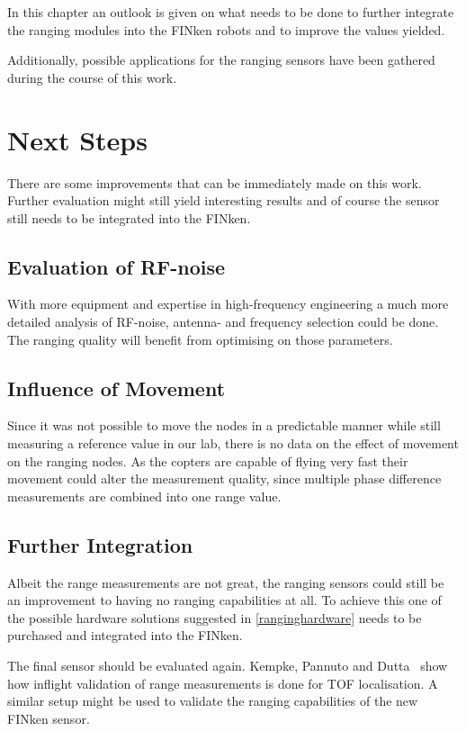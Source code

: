 In this chapter an outlook is given on what needs to be done to further integrate the ranging modules into the FINken robots and to improve the values yielded.

Additionally, possible applications for the ranging sensors have been gathered during the course of this work.

\section{Next Steps}

There are some improvements that can be immediately made on this work.
Further evaluation might still yield interesting results and of course the sensor still needs to be integrated into the FINken.

\subsection{Evaluation of RF-noise}
With more equipment and expertise in high-frequency engineering a much more detailed analysis of RF-noise, antenna- and frequency selection could be done.
The ranging quality will benefit from optimising on those parameters.

\subsection{Influence of Movement}
Since it was not possible to move the nodes in a predictable manner while still measuring a reference value in our lab, there is no data on the effect of movement on the ranging nodes.
As the copters are capable of flying very fast their movement could alter the measurement quality, since multiple phase difference measurements are combined into one range value.

\subsection{Further Integration}

Albeit the range measurements are not great, the ranging sensors could still be an improvement to having no ranging capabilities at all.
To achieve this one of the possible hardware solutions suggested in \autoref{ranginghardware} needs to be purchased and integrated into the FINken.

The final sensor should be evaluated again.
Kempke, Pannuto and Dutta~\cite{uwb_localisation_copter} show how inflight validation of range measurements is done for TOF localisation.
A similar setup might be used to validate the ranging capabilities of the new FINken sensor.

